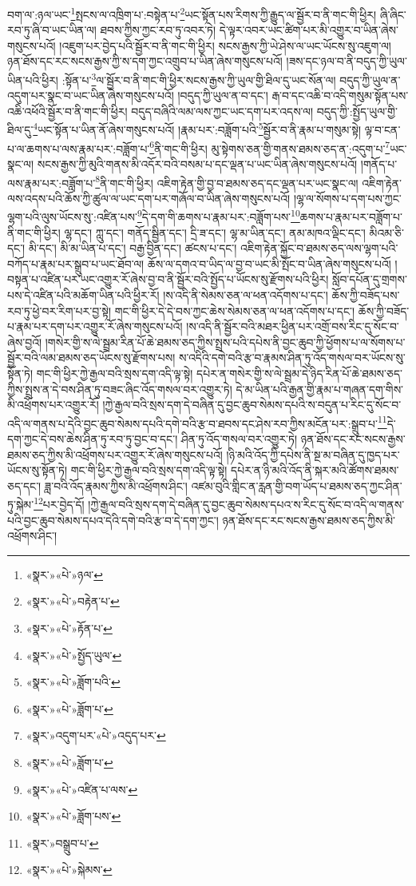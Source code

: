 བག་ལ་:ཉལ་ཡང་\footnote{«སྣར་»«པེ་»ཉལ་}སྤངས་ལ་འཁྲིག་པ་:བསྟེན་པ་\footnote{«སྣར་»«པེ་»བརྟེན་པ་}ཡང་སྟོན་པས་རིགས་ཀྱི་རྒྱུད་ལ་སྦྱོར་བ་ནི་གང་གི་ཕྱིར། ཞི་ཞིང་རབ་ཏུ་ཞི་བ་ཡང་ཡིན་ལ། ཐབས་ཀྱིས་ཀྱང་རབ་ཏུ་འབར་ཏེ། དེ་ལྟར་འབར་ཡང་ཚིག་པར་མི་འགྱུར་བ་ཡིན་ཞེས་གསུངས་པའོ། །འཇུག་པར་བྱེད་པའི་སྦྱོར་བ་ནི་གང་གི་ཕྱིར། སངས་རྒྱས་ཀྱི་ཡེ་ཤེས་ལ་ཡང་ཡོངས་སུ་འཇུག་ལ། ཉན་ཐོས་དང་རང་སངས་རྒྱས་ཀྱི་ས་དག་ཀྱང་འགྲུབ་པ་ཡིན་ཞེས་གསུངས་པའོ། །ཟས་དང་ཉལ་བ་ནི་བདུད་ཀྱི་ཡུལ་ཡིན་པའི་ཕྱིར། :སྟོན་པ་\footnote{«སྣར་»«པེ་»རྟོན་པ་}ལ་སྦྱོར་བ་ནི་གང་གི་ཕྱིར་སངས་རྒྱས་ཀྱི་ཡུལ་གྱི་ཐིལ་དུ་ཡང་སོན་ལ། བདུད་ཀྱི་ཡུལ་ན་འདུག་པར་སྣང་བ་ཡང་ཡིན་ཞེས་གསུངས་པའོ། །བདུད་ཀྱི་ཡུལ་ན་བ་དང་། རྒ་བ་དང་འཆི་བ་འདི་གསུམ་སྟོན་པས་འཆི་འཕོའི་སྦྱོར་བ་ནི་གང་གི་ཕྱིར། བདུད་བཞིའི་ལམ་ལས་ཀྱང་ཡང་དག་པར་འདས་ལ། བདུད་ཀྱི་:སྤྱོད་ཡུལ་གྱི་ཐིལ་དུ་\footnote{«སྣར་»«པེ་»སྤྱོད་ཡུལ་}ཡང་སྟོན་པ་ཡིན་ནོ་ཞེས་གསུངས་པའོ། །རྣམ་པར་:བཟློག་པའི་\footnote{«སྣར་»«པེ་»ཟློག་པའི་}སྦྱོར་བ་ནི་རྣམ་པ་གསུམ་སྟེ། ལྟ་བ་ངན་པ་ལ་ཆགས་པ་ལས་རྣམ་པར་:བཟློག་པ་\footnote{«སྣར་»«པེ་»ཟློག་པ་}ནི་གང་གི་ཕྱིར། མུ་སྟེགས་ཅན་གྱི་གནས་ཐམས་ཅད་ན་:འདུག་པ་\footnote{«སྣར་»འདུག་པར་«པེ་»འདུད་པར་}ཡང་སྣང་ལ། སངས་རྒྱས་ཀྱི་མུའི་གནས་མི་འདོར་བའི་བསམ་པ་དང་ལྡན་པ་ཡང་ཡིན་ཞེས་གསུངས་པའོ། །གནོད་པ་ལས་རྣམ་པར་:བཟློག་པ་\footnote{«སྣར་»«པེ་»ཟློག་པ་}ནི་གང་གི་ཕྱིར། འཇིག་རྟེན་གྱི་བྱ་བ་ཐམས་ཅད་དང་ལྡན་པར་ཡང་སྣང་ལ། འཇིག་རྟེན་ལས་འདས་པའི་ཆོས་ཀྱི་ཚུལ་ལ་ཡང་དག་པར་གཞོལ་བ་ཡིན་ཞེས་གསུངས་པའོ། །ལྷ་ལ་སོགས་པ་དག་པས་ཀྱང་ལྷག་པའི་ལུས་ཡོངས་སུ་:འཛིན་པས་\footnote{«སྣར་»«པེ་»འཛིན་པ་ལས་}དེ་དག་གི་ཆགས་པ་རྣམ་པར་:བཟློག་པས་\footnote{«སྣར་»«པེ་»ཟློག་པས་}ཆགས་པ་རྣམ་པར་བཟློག་པ་ནི་གང་གི་ཕྱིར། ལྷ་དང་། ཀླུ་དང་། གནོད་སྦྱིན་དང་། དྲི་ཟ་དང་། ལྷ་མ་ཡིན་དང་། ནམ་མཁའ་ལྡིང་དང་། མིའམ་ཅི་དང་། མི་དང་། མི་མ་ཡིན་པ་དང་། བརྒྱ་བྱིན་དང་། ཚངས་པ་དང་། འཇིག་རྟེན་སྐྱོང་བ་ཐམས་ཅད་ལས་ལྷག་པའི་བཀོད་པ་རྣམ་པར་སྒྲུབ་པ་ཡང་ཐོབ་ལ། ཆོས་ལ་དགའ་བ་ཡིད་ལ་བྱ་བ་ཡང་མི་སྤོང་བ་ཡིན་ཞེས་གསུངས་པའོ། །བསྟན་པ་འཛིན་པར་ཡང་འགྱུར་རོ་ཞེས་བྱ་བ་ནི་སྦྱོར་བའི་སྤྱོད་པ་ཡོངས་སུ་རྫོགས་པའི་ཕྱིར། སློབ་དཔོན་དུ་གྲགས་པས་དེ་འཛིན་པའི་མཆོག་ཡིན་པའི་ཕྱིར་རོ། །ས་འདི་ནི་སེམས་ཅན་ལ་ཕན་འདོགས་པ་དང་། ཆོས་ཀྱི་བཟོད་པས་རབ་ཏུ་ཕྱེ་བར་རིག་པར་བྱ་སྟེ། གང་གི་ཕྱིར་དེ་དེ་བས་ཀྱང་ཆེས་སེམས་ཅན་ལ་ཕན་འདོགས་པ་དང་། ཆོས་ཀྱི་བཟོད་པ་རྣམ་པར་དག་པར་འགྱུར་རོ་ཞེས་གསུངས་པའོ། །ས་འདི་ནི་སྦྱོར་བའི་མཐར་ཕྱིན་པར་འགྲོ་བས་རིང་དུ་སོང་བ་ཞེས་བྱའོ། །གསེར་གྱི་ས་ལེ་སྦྲམ་རིན་པོ་ཆེ་ཐམས་ཅད་ཀྱིས་སྤྲས་པའི་དཔེས་ནི་བྱང་ཆུབ་ཀྱི་ཕྱོགས་པ་ལ་སོགས་པ་སྦྱོར་བའི་ལམ་ཐམས་ཅད་ཡོངས་སུ་རྫོགས་པས། ས་འདིའི་དགེ་བའི་རྩ་བ་རྣམས་ཤིན་ཏུ་འོད་གསལ་བར་ཡོངས་སུ་སྟོན་ཏེ། གང་གི་ཕྱིར་ཀྱེ་རྒྱལ་བའི་སྲས་དག་འདི་ལྟ་སྟེ། དཔེར་ན་གསེར་གྱི་ས་ལེ་སྦྲམ་དེ་ཉིད་རིན་པོ་ཆེ་ཐམས་ཅད་ཀྱིས་སྤྲས་ན་དེ་བས་ཤིན་ཏུ་བཟང་ཞིང་འོད་གསལ་བར་འགྱུར་ཏེ། དེ་མ་ཡིན་པའི་རྒྱན་གྱི་རྣམ་པ་གཞན་དག་གིས་མི་འཕྲོགས་པར་འགྱུར་རོ། །ཀྱེ་རྒྱལ་བའི་སྲས་དག་དེ་བཞིན་དུ་བྱང་ཆུབ་སེམས་དཔའི་ས་བདུན་པ་རིང་དུ་སོང་བ་འདི་ལ་གནས་པ་དེའི་བྱང་ཆུབ་སེམས་དཔའི་དགེ་བའི་རྩ་བ་ཐབས་དང་ཤེས་རབ་ཀྱིས་མངོན་པར་:སྒྲུབ་པ་\footnote{«སྣར་»བསྒྲུབ་པ་}དེ་དག་ཀྱང་དེ་བས་ཆེས་ཤིན་ཏུ་རབ་ཏུ་བྱང་བ་དང་། ཤིན་ཏུ་འོད་གསལ་བར་འགྱུར་ཏེ། ཉན་ཐོས་དང་རང་སངས་རྒྱས་ཐམས་ཅད་ཀྱིས་མི་འཕྲོགས་པར་འགྱུར་རོ་ཞེས་གསུངས་པའོ། །ཉི་མའི་འོད་ཀྱི་དཔེས་ནི་སྔ་མ་བཞིན་དུ་ཁྱད་པར་ཡོངས་སུ་སྟོན་ཏེ། གང་གི་ཕྱིར་ཀྱེ་རྒྱལ་བའི་སྲས་དག་འདི་ལྟ་སྟེ། དཔེར་ན་ཉི་མའི་འོད་ནི་སྐར་མའི་ཚོགས་ཐམས་ཅད་དང་། ཟླ་བའི་འོད་རྣམས་ཀྱིས་མི་འཕྲོགས་ཤིང་། འཛམ་བུའི་གླིང་ན་རླན་གྱི་བག་ཡོད་པ་ཐམས་ཅད་ཀྱང་ཤིན་ཏུ་སྐེམ་\footnote{«སྣར་»«པེ་»སྐེམས་}པར་བྱེད་དོ། །ཀྱེ་རྒྱལ་བའི་སྲས་དག་དེ་བཞིན་དུ་བྱང་ཆུབ་སེམས་དཔའ་ས་རིང་དུ་སོང་བ་འདི་ལ་གནས་པའི་བྱང་ཆུབ་སེམས་དཔའ་དེའི་དགེ་བའི་རྩ་བ་དེ་དག་ཀྱང་། ཉན་ཐོས་དང་རང་སངས་རྒྱས་ཐམས་ཅད་ཀྱིས་མི་འཕྲོགས་ཤིང་། 